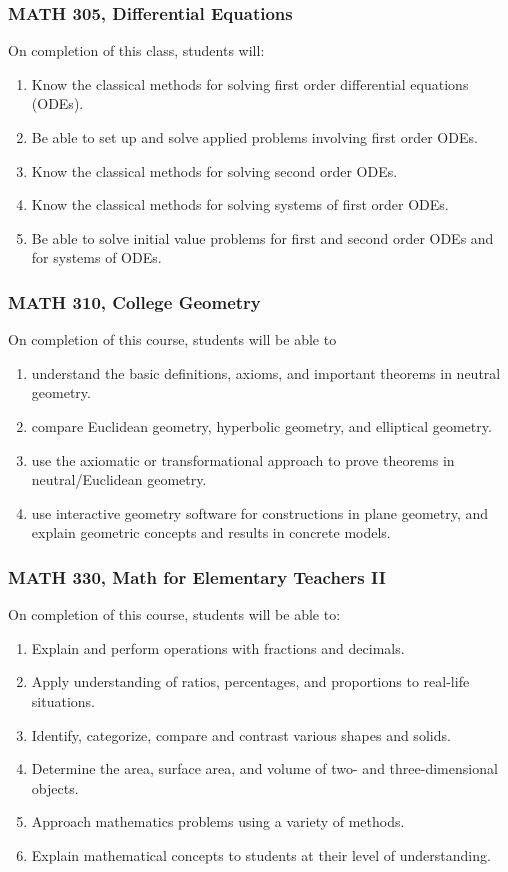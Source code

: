 \documentclass[11pt]{article}
\newenvironment{alphalist}{
  \begin{enumerate}[(1)]
    \addtolength{\itemsep}{-1.0\itemsep}}
  {\end{enumerate}}
\begin{document}
\subsubsection*{MATH 305, Differential Equations}

On completion of this class, students will: 
\begin{alphalist}
    \item Know the classical methods for solving first order differential equations (ODEs).
    \item Be able to set up and solve applied problems involving first order ODEs.
    \item Know the classical methods for solving second order ODEs.
    \item Know the classical methods for solving systems of first order ODEs.
    \item Be able to solve initial value problems for first and second order ODEs and for systems of ODEs.
\end{alphalist}

\subsubsection*{MATH 310, College Geometry}

On completion of this course, students will be able to
\begin{alphalist}
    \item understand the basic definitions, axioms, and important theorems in neutral geometry.
    \item compare Euclidean geometry, hyperbolic geometry, and elliptical geometry.
    \item use the axiomatic or transformational approach to prove theorems in neutral/Euclidean geometry.
    \item use interactive geometry software for constructions in plane geometry, and
    explain geometric concepts and results in concrete models.
\end{alphalist}

\subsubsection*{MATH 330, Math for Elementary Teachers II}

On completion of this course, students will be able to: 
\begin{alphalist}
\item Explain and perform operations with fractions and decimals. 
\item Apply understanding of ratios, percentages, and proportions to real-life situations. 
\item Identify, categorize, compare and contrast various shapes and solids. 
\item Determine the area, surface area, and volume of two- and three-dimensional objects. 
\item Approach mathematics problems using a variety of methods. 
\item Explain mathematical concepts to students at their level of understanding.
\end{alphalist}
\end{document}
